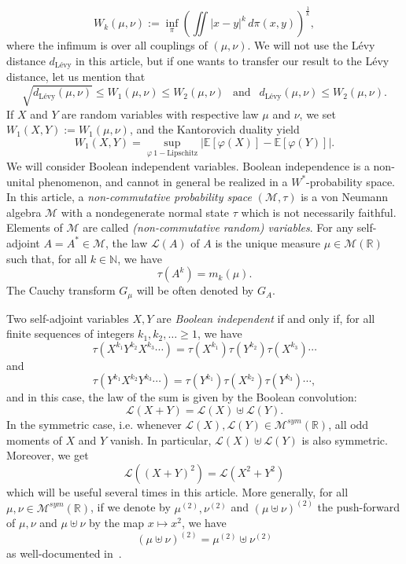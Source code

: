 \documentclass[10pt, reqno]{amsart}
\numberwithin{equation}{section}
\theoremstyle{definition}
\theoremstyle{plain}
\theoremstyle{remark}
\newcommand{\R}{\mathbb{R}}
\newcommand{\1}{\mathbbm{1}}
\begin{document}
   \begin{equation*}
		W_k(\mu,\nu):=\inf_{\pi} \left(\iint |x-y|^k\,d\pi(x,y)\right)^{\frac{1}{k}} ,
	\end{equation*}
   where the infimum is over all couplings of $(\mu,\nu)$. We will not use the Lévy distance $d_{\text{Lévy}}$ in this article, but if one wants to transfer our result to the Lévy distance, let us mention that
   $$\sqrt{d_{\text{Lévy}}(\mu,\nu)} \leq W_1(\mu,\nu)\leq W_2(\mu,\nu)\ \ \text{ and }\ \ 
 d_{\text{Lévy}}(\mu,\nu)\leq W_2(\mu,\nu).$$
 If $X$ and $Y$ are random variables with respective law $\mu$ and $\nu$, we set
 $W_1(X,Y):=W_1(\mu,\nu)$, and the Kantorovich duality yield
 $$W_1(X,Y)=\sup_{\varphi\ 1-\text{Lipschitz}}|\mathbb{E}[\varphi(X)]-\mathbb{E}[\varphi(Y)]|.$$
We will consider Boolean independent variables. Boolean independence is a non-unital
phenomenon, and cannot in general be realized in a $W^*$-probability space. In this article, a \textit{non-commutative probability space} $(\mathcal{M},\tau)$ is a von Neumann algebra $\mathcal{M}$ with a nondegenerate normal state $\tau$ which is not necessarily faithful. Elements of $\mathcal{M}$ are called \textit{(non-commutative random) variables}. For any self-adjoint $A=A^*\in \mathcal{M}$, the law $\mathcal{L}(A)$ of $A$ is the unique measure $\mu\in \mathcal{M}(\R)$ such that, for all $k\in \mathbb{N}$, we have
$$\tau(A^k)=m_k(\mu).$$
The Cauchy transform $G_{\mu}$ will be often denoted by $G_A$.

Two self-adjoint variables $X,Y$ are \textit{Boolean independent} if and only if, for all finite sequences of integers $k_1,k_2, \ldots \geq 1$, we have
$$\tau(X^{k_1}Y^{k_2}X^{k_3}\cdots)=\tau(X^{k_1})\tau(Y^{k_2})\tau(X^{k_3})\cdots $$
and
$$\tau(Y^{k_1}X^{k_2}Y^{k_3}\cdots)=\tau(Y^{k_1})\tau(X^{k_2})\tau(Y^{k_3})\cdots,$$
and in this case, the law of the sum is given by the Boolean convolution: $$\mathcal{L}(X+Y)=\mathcal{L}(X)\uplus\mathcal{L}(Y).$$
In the symmetric case, i.e. whenever $\mathcal{L}(X),\mathcal{L}(Y)\in \mathcal{M}^{sym}(\R)$, all odd moments of $X$ and $Y$ vanish. In particular, $\mathcal{L}(X)\uplus\mathcal{L}(Y)$ is also symmetric. Moreover, we get
\begin{equation}\label{eq:square}
    \mathcal{L}((X+Y)^2)=\mathcal{L}(X^2+Y^2)
\end{equation}
which will be useful several times in this article. More generally, for all $\mu, \nu\in \mathcal{M}^{sym}(\R)$, if we denote by $\mu^{(2)}, \nu^{(2)}$ and $(\mu\uplus\nu)^{(2)}$ the push-forward of $\mu, \nu$ and $\mu\uplus\nu$ by the map $x\mapsto x^2$, we have
$$(\mu\uplus\nu)^{(2)}=\mu^{(2)}\uplus \nu^{(2)} $$
as well-documented in~\cite{mlotkowski2011symmetrization}.
\end{document}
